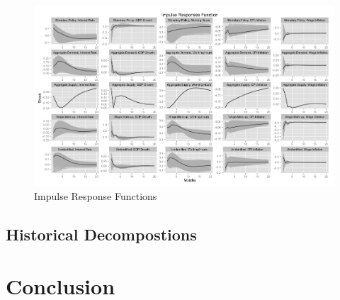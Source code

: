 \documentclass[11pt]{article}\usepackage[]{graphicx}\usepackage[]{color}
\begin{document}
\begin{figure}[H]
\centering
\includegraphics[scale=0.5]{IRF}
\caption{Impulse Response Functions}
\end{figure}





\subsection{Historical Decompostions}

\section{Conclusion}


\end{document}
